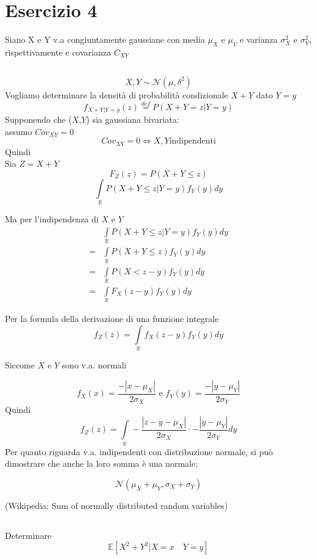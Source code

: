 \documentclass[a4paper]{article}
\newcommand{\E}[0]{\mathbb{E}}
\begin{document}
\section{Esercizio 4}
Siano X e Y v.a congiuntamente gaussiane con media $\mu_X$ e $\mu_Y$ e varianza  $\sigma^2_X$ e $\sigma^2_Y$, rispettivamente e covarianza $C_{XY}$
\subsection{}
$$X,Y \sim \mathcal{N}(\mu,\delta^2 )$$
Vogliamo determinare la densità di probabilità condizionale $X + Y$ dato $Y = y$
$$
f_{X+Y|Y=y}(z)\stackrel{def}{=}P(X+Y=z | Y=y)
$$
Supponendo che ($X$,$Y$) sia gaussiana bivariata:\\
assumo $Cov_{XY}=0$ \\
$$
Cov_{XY}=0 \iff X, Y \text{indipendenti}
$$
Quindi\\

Sia $Z = X + Y$
$$
F_Z(z)=P(X+Y\le z)
$$
$$
\underset{\mathbb{R}}{\int}P(X+Y\le z|Y=y)f_Y(y)dy
$$

Ma per l'indipendenza di $X$ e $Y$
\begin{align*}
    &\underset{\mathbb{R}}{\int}P(X+Y\le z|Y=y)f_Y(y)dy\\
    =&\underset{\mathbb{R}}{\int}P(X+Y\le z)f_Y(y)dy \\
    =&\underset{\mathbb{R}}{\int}P(X < z - y )f_Y(y)dy \\
    =&\underset{\mathbb{R}}{\int}F_X(z - y)f_Y(y)dy
\end{align*}

Per la formula della derivazione di una funzione integrale
$$
f_Z(z) = \underset{\mathbb{R}}{\int}f_X(z-y)f_Y(y)dy
$$

Siccome $X$ e $Y$ sono v.a. normali

$$
f_X(x)=\frac{-|x- \mu_X|}{2\sigma_X} \text { e } f_Y(y)=\frac{-|y- \mu_Y|}{2\sigma_Y}
$$
Quindi
$$
f_Z(z) = \underset{\mathbb{R}}{\int}-\frac{|z-y- \mu_X|}{2\sigma_X}\cdot-\frac{|y- \mu_Y|}{2\sigma_Y}dy
$$
Per quanto riguarda v.a. indipendenti con distribuzione normale, si può dimostrare che anche la loro somma è una normale:

$$
\mathcal{N}(\mu_X + \mu_Y, \sigma_X + \sigma_Y)
$$

(Wikipedia: Sum of normally distributed random variables)

\subsection{}
Determinare $$\E[X^2 + Y^2 |X = x \quad Y = y]$$
\end{document}
